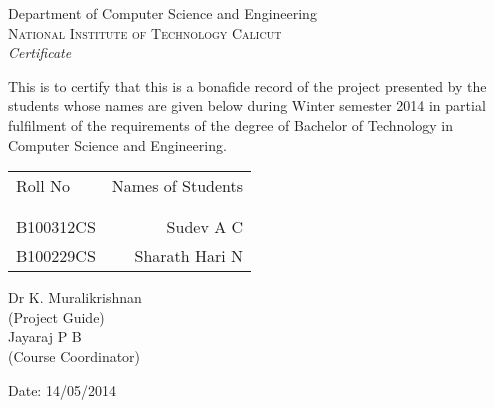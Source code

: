 \newpage
\thispagestyle{empty}

\begin{center}

\huge{Department of Computer Science and Engineering}\\[0.5cm]
\normalsize
\textsc{National Institute of Technology Calicut}\\[2.0cm]

\emph{\LARGE Certificate}\\[2.5cm]
\end{center}
\normalsize This is to certify that this is a bonafide record of the project presented by the students whose names are given below during Winter semester 2014 in partial fulfilment of the requirements of the degree of Bachelor of Technology in Computer Science and Engineering.\\[1.0cm]

\begin{table}[h]
\centering
\begin{tabular}{lr}
Roll No & Names of Students \\ \\ \hline
\\
B100312CS & Sudev A C \\ 
B100229CS & Sharath Hari N \\
\end{tabular}
\end{table}

\vfill


\begin{flushright}
Dr K. Muralikrishnan\\
(Project Guide)\\[1.5cm]
Jayaraj P B\\
(Course Coordinator)\\
\end{flushright}

\begin{flushleft}
Date: 14/05/2014
\end{flushleft}
